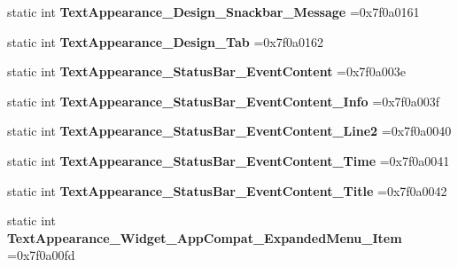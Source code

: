 \begin{DoxyCompactItemize}
static int {\bfseries Text\+Appearance\+\_\+\+Design\+\_\+\+Snackbar\+\_\+\+Message} =0x7f0a0161
\item 
\mbox{\label{classandroid_1_1support_1_1v7_1_1mediarouter_1_1R_1_1style_a9a7f4bebd481b89b2f21e9988ab29c9a}} 
static int {\bfseries Text\+Appearance\+\_\+\+Design\+\_\+\+Tab} =0x7f0a0162
\item 
\mbox{\label{classandroid_1_1support_1_1v7_1_1mediarouter_1_1R_1_1style_abe5cbfeeb949b7a00534b92c4bd1de92}} 
static int {\bfseries Text\+Appearance\+\_\+\+Status\+Bar\+\_\+\+Event\+Content} =0x7f0a003e
\item 
\mbox{\label{classandroid_1_1support_1_1v7_1_1mediarouter_1_1R_1_1style_ae421b39945162d8e55c425eb4fa278f8}} 
static int {\bfseries Text\+Appearance\+\_\+\+Status\+Bar\+\_\+\+Event\+Content\+\_\+\+Info} =0x7f0a003f
\item 
\mbox{\label{classandroid_1_1support_1_1v7_1_1mediarouter_1_1R_1_1style_a72e7f3fed11ae0339701f9bb8d96e302}} 
static int {\bfseries Text\+Appearance\+\_\+\+Status\+Bar\+\_\+\+Event\+Content\+\_\+\+Line2} =0x7f0a0040
\item 
\mbox{\label{classandroid_1_1support_1_1v7_1_1mediarouter_1_1R_1_1style_ab4f13c185e6666d319453515480b1488}} 
static int {\bfseries Text\+Appearance\+\_\+\+Status\+Bar\+\_\+\+Event\+Content\+\_\+\+Time} =0x7f0a0041
\item 
\mbox{\label{classandroid_1_1support_1_1v7_1_1mediarouter_1_1R_1_1style_a21ed60be54443600430be41bfbc4b73a}} 
static int {\bfseries Text\+Appearance\+\_\+\+Status\+Bar\+\_\+\+Event\+Content\+\_\+\+Title} =0x7f0a0042
\item 
\mbox{\label{classandroid_1_1support_1_1v7_1_1mediarouter_1_1R_1_1style_a973bb8309569605ed0fc6212ba1bd43a}} 
static int {\bfseries Text\+Appearance\+\_\+\+Widget\+\_\+\+App\+Compat\+\_\+\+Expanded\+Menu\+\_\+\+Item} =0x7f0a00fd

\end{DoxyCompactItemize}
